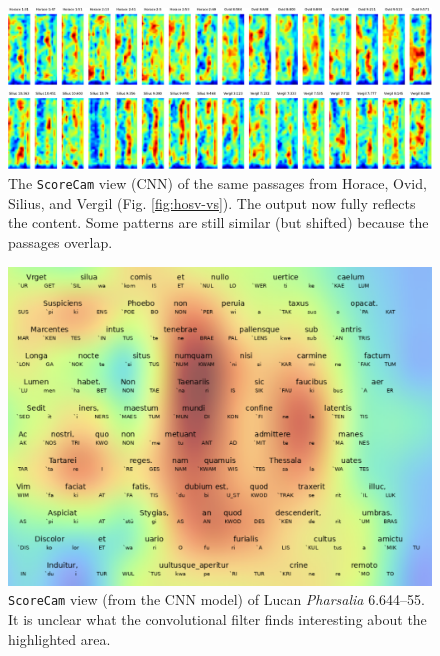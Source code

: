 \documentclass[
    twocolumn,
    hf,
]{ceurart}
\begin{document}
\begin{figure}
    \includegraphics[width=\textwidth]{figures/hosv-sc-crop.pdf}
    \caption{The \texttt{ScoreCam} view (CNN) of the same passages
        from Horace, Ovid, Silius, and Vergil (Fig. \ref{fig:hosv-vs}). The
        output now fully reflects the content. Some patterns are still similar
        (but shifted) because the passages overlap.}
    \label{fig:hosv-sc}
\end{figure}

\begin{figure}
    \includegraphics[width=\linewidth]{figures/lucan_scorecam.png}
    \caption{\texttt{ScoreCam} view (from the CNN model) of Lucan
        \emph{Pharsalia} 6.644--55. It is unclear what the convolutional filter
        finds interesting about the highlighted area.}
    \label{fig:lucan_scorecam}
\end{figure}
\end{document}
